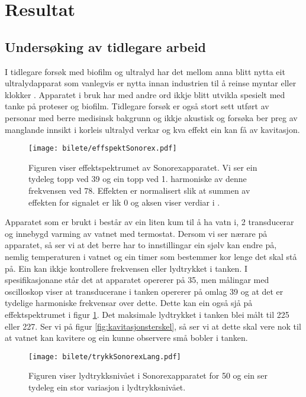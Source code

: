 \section{Resultat}
\subsection{Undersøking av tidlegare arbeid}
I tidlegare forsøk med biofilm og ultralyd har det mellom anna blitt nytta eit ultralydapparat som vanlegvis er nytta innan industrien til å reinse myntar eller klokker \cite{sonorex}. Apparatet i bruk har med andre ord ikkje blitt utvikla spesielt med tanke på proteser og biofilm. Tidlegare forsøk er også stort sett utført av personar med berre medisinsk bakgrunn og ikkje akustisk og forsøka ber preg av manglande innsikt i korleis ultralyd verkar og kva effekt ein kan få av kavitasjon.

\begin{figure}[htbp]
	\centering
	\texttt{[image: bilete/effspektSonorex.pdf]}
	\caption[Effektspektrum av Sonorexapparat]{Figuren viser effektspektrumet av Sonorexapparatet. Vi ser ein tydeleg topp ved \unit{39}{\kilo\hertz} og ein 	topp ved 1. harmoniske av denne frekvensen ved \unit{78}{\kilo\hertz}. Effekten er normalisert slik at summen av effekten for signalet er lik \unit{0}{\deci		\bel} og aksen viser verdiar i \deci\bel.}
	\label{fig:effektsonorex}
\end{figure}

Apparatet som er brukt i \cite{ultraprotese} består av ein liten kum til å ha vatn i, 2 transducerar og innebygd varming av vatnet med termostat. Dersom vi ser nærare på apparatet, så ser vi at det berre har to innstillingar ein sjølv kan endre på, nemlig temperaturen i vatnet og ein timer som bestemmer kor lenge det skal stå på. Ein kan ikkje kontrollere frekvensen eller lydtrykket i tanken. I spesifikasjonane \cite{sonorex} står det at apparatet opererer på \unit{35}{\kilo\hertz}, men målingar med oscilloskop viser at transducerane i tanken opererer på omlag \unit{39}{\kilo\hertz} og at det er tydelige harmoniske frekvensar over dette. Dette kan ein også sjå på effektspektrumet i figur \ref{fig:effektsonorex}. Det maksimale lydtrykket i tanken blei målt til \unit{225}{\kilo\pascal} eller \unit{227}{\deci\bel}. Ser vi på figur \ref{fig:kavitasjonsterskel}, så ser vi at dette skal vere nok til at vatnet kan kavitere og ein kunne observere små bobler i tanken.

\begin{figure}[htbp]
	\centering
	\texttt{[image: bilete/trykkSonorexLang.pdf]}
	\caption[Lydtrykksnivå i Sonorexapparat]{Figuren viser lydtrykksnivået i Sonorexapparatet for \unit{50}{\milli\second} og ein ser tydeleg ein stor variasjon i 	lydtrykksnivået.}
	\label{fig:trykksonorexlang}
\end{figure}


